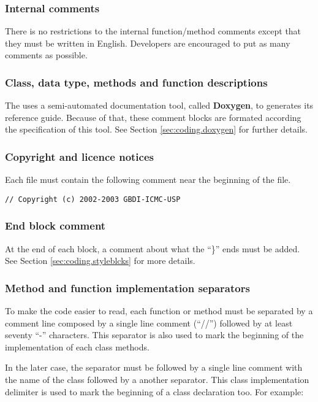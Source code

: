\subsubsection{Internal comments}
There is no restrictions to the internal function/method comments except that they must be written in English. Developers are encouraged to put as many comments as possible.

\subsubsection{Class, data type, methods and function descriptions}
The \libname{ }uses a semi-automated documentation tool, called {\bf Doxygen}, to generates its reference guide. Because of that, these comment blocks are formated according the specification of this tool. See Section \ref{sec:coding.doxygen} for further details.

\subsubsection{Copyright and licence notices}

Each file must contain the following comment near the beginning of the file.

\begin{code}
\begin{verbatim}
// Copyright (c) 2002-2003 GBDI-ICMC-USP
\end{verbatim}
\end{code}

\subsubsection{End block comment}

At the end of each block, a comment about what the ``\}'' ends must be added. See Section \ref{sec:coding.styleblcks} for more details.

\subsubsection{Method and function implementation separators}

To make the code easier to read, each function or method must be separated by a comment line composed by a
single line comment (``//'') followed by at least seventy ``-'' characters. This separator is also used to mark the beginning of the implementation of each class methods.

In the later case, the separator must be followed by a single line comment with the name of the class followed by a another separator. This class implementation delimiter is used to mark the beginning of a class declaration too. For example:

